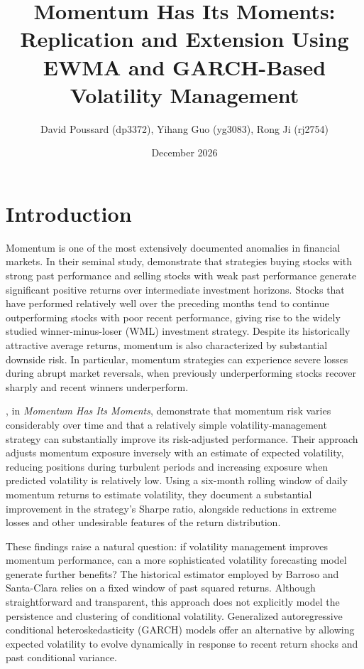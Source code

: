 \documentclass[11pt]{article}
\title{Momentum Has Its Moments: Replication and Extension Using
EWMA and GARCH-Based Volatility Management}
\author{David Poussard (dp3372), Yihang Guo (yg3083), Rong Ji (rj2754)}
\date{December 2026}
\begin{document}
\maketitle


\section{Introduction}
\label{sec:introduction}


Momentum is one of the most extensively documented
anomalies in financial markets. In their seminal study,
\citet{jegadeesh1993returns} demonstrate that strategies
buying stocks with strong past performance and selling
stocks with weak past performance generate significant
positive returns over intermediate investment horizons.
 Stocks that have performed relatively well over
the preceding months tend to continue outperforming stocks with
poor recent performance, giving rise to the widely studied
winner-minus-loser (WML) investment strategy. Despite its
historically attractive average returns, momentum is also
characterized by substantial downside risk. In particular,
momentum strategies can experience severe losses during abrupt
market reversals, when previously underperforming stocks recover
sharply and recent winners underperform.


\citet{barroso2015momentum}, in
\textit{Momentum Has Its Moments}, demonstrate that
momentum risk varies considerably over time and that a relatively simple volatility-management
strategy can substantially improve its risk-adjusted
performance. Their approach adjusts momentum exposure inversely
with an estimate of expected volatility, reducing positions
during turbulent periods and increasing exposure when predicted
volatility is relatively low. Using a six-month rolling window
of daily momentum returns to estimate volatility, they document
a substantial improvement in the strategy's Sharpe ratio,
alongside reductions in extreme losses and other undesirable
features of the return distribution.

These findings raise a natural question: if volatility
management improves momentum performance, can a more
sophisticated volatility forecasting model generate further
benefits? The historical estimator employed by Barroso and
Santa-Clara relies on a fixed window of past squared returns.
Although straightforward and transparent, this approach does
not explicitly model the persistence and clustering of
conditional volatility. Generalized autoregressive conditional
heteroskedasticity (GARCH) models offer an alternative by
allowing expected volatility to evolve dynamically in response
to recent return shocks and past conditional variance.
\end{document}
